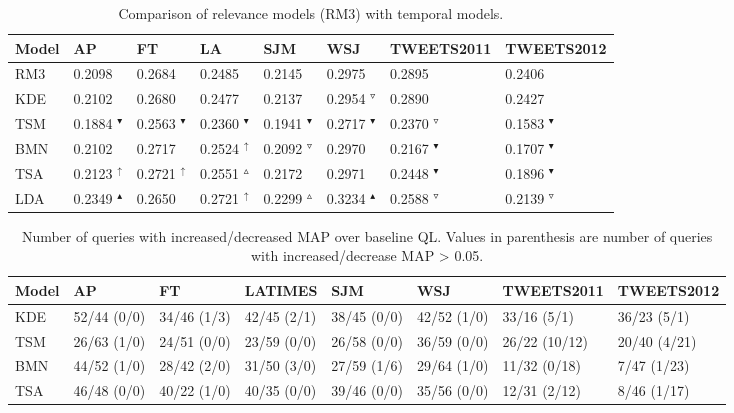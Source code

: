 \documentclass{sig-alternate}
\begin{document}
\begin{table*}[t]
\small
\caption{Comparison of relevance models (RM3) with temporal models. }
\begin{center}
\tabcolsep=0.11cm
\begin{tabular}{| l | l | l | l | l | l | l | l |}
\hline
\bf{Model}& \bf{AP} & \bf{FT} & \bf{LA} & \bf{SJM} & \bf{WSJ} & \bf{TWEETS2011} & \bf{TWEETS2012} \\ \hline 
RM3 & 0.2098  & 0.2684  & 0.2485  & 0.2145  & 0.2975  & 0.2895  & 0.2406 \\ \hline  \hline
KDE & 0.2102  & 0.2680  & 0.2477  & 0.2137  & 0.2954 $^{\triangledown}$  & 0.2890  & 0.2427 \\ \hline 
TSM & 0.1884 $^{\blacktriangledown}$  & 0.2563 $^{\blacktriangledown}$  & 0.2360 $^{\blacktriangledown}$  & 0.1941 $^{\blacktriangledown}$  & 0.2717 $^{\blacktriangledown}$  & 0.2370 $^{\triangledown}$  & 0.1583 $^{\blacktriangledown}$ \\ \hline 
BMN & 0.2102  & 0.2717  & 0.2524 $^{\uparrow}$  & 0.2092 $^{\triangledown}$  & 0.2970  & 0.2167 $^{\blacktriangledown}$  & 0.1707 $^{\blacktriangledown}$ \\ \hline 
TSA & 0.2123 $^{\uparrow}$  & 0.2721 $^{\uparrow}$  & 0.2551 $^{\vartriangle}$  & 0.2172  & 0.2971  & 0.2448 $^{\blacktriangledown}$  & 0.1896 $^{\blacktriangledown}$ \\ \hline 
LDA & 0.2349 $^{\blacktriangle}$  & 0.2650  & 0.2721 $^{\uparrow}$  & 0.2299 $^{\vartriangle}$  & 0.3234 $^{\blacktriangle}$  & 0.2588 $^{\triangledown}$  & 0.2139 $^{\triangledown}$ \\ \hline 
\end{tabular}
\end{center}
\label{table.results.rm3}
\normalsize
\end{table*}

\begin{table*}[t]
\small
\caption{Number of queries with increased/decreased MAP over baseline QL. Values in parenthesis are number of queries with increased/decrease MAP > 0.05. }
\begin{center}
\tabcolsep=0.11cm
\begin{tabular}{l | l | l | l | l | l | l | l}
\hline
\bf{Model}& \bf{AP} & \bf{FT} & \bf{LATIMES} & \bf{SJM} & \bf{WSJ} & \bf{TWEETS2011} & \bf{TWEETS2012} \\ \hline 
KDE & 52/44 (0/0)  & 34/46 (1/3)  & 42/45 (2/1)  & 38/45 (0/0)  & 42/52 (1/0)  & 33/16 (5/1)  & 36/23 (5/1) \\ \hline 
TSM & 26/63 (1/0)  & 24/51 (0/0)  & 23/59 (0/0)  & 26/58 (0/0)  & 36/59 (0/0)  & 26/22 (10/12)  & 20/40 (4/21) \\ \hline 
BMN & 44/52 (1/0)  & 28/42 (2/0)  & 31/50 (3/0)  & 27/59 (1/6)  & 29/64 (1/0)  & 11/32 (0/18)  & 7/47 (1/23) \\ \hline 
TSA & 46/48 (0/0)  & 40/22 (1/0)  & 40/35 (0/0)  & 39/46 (0/0)  & 35/56 (0/0)  & 12/31 (2/12)  & 8/46 (1/17) \\ \hline 
\end{tabular}
\end{center}
\label{table.posneg.ql}
\normalsize
\end{table*}
\end{document}
